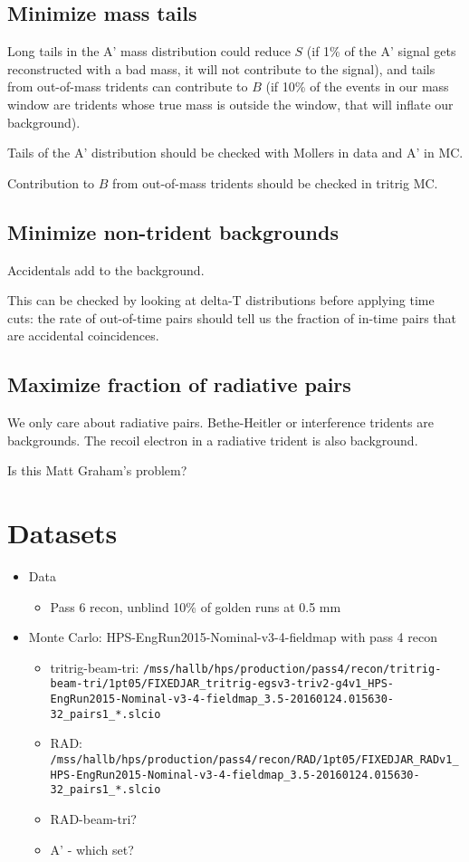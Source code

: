 \documentclass[twoside]{article}
\begin{document}
\subsection{Minimize mass tails}
Long tails in the A' mass distribution could reduce $S$ (if 1\% of the A' signal gets reconstructed with a bad mass, it will not contribute to the signal), and tails from out-of-mass tridents can contribute to $B$ (if 10\% of the events in our mass window are tridents whose true mass is outside the window, that will inflate our background).

Tails of the A' distribution should be checked with Mollers in data and A' in MC.

Contribution to $B$ from out-of-mass tridents should be checked in tritrig MC.

\subsection{Minimize non-trident backgrounds}
Accidentals add to the background.

This can be checked by looking at delta-T distributions before applying time cuts: the rate of out-of-time pairs should tell us the fraction of in-time pairs that are accidental coincidences.

\subsection{Maximize fraction of radiative pairs}
We only care about radiative pairs. Bethe-Heitler or interference tridents are backgrounds. The recoil electron in a radiative trident is also background.

Is this Matt Graham's problem?

\section{Datasets}
\begin{itemize}
    \item Data
        \begin{itemize}
            \item Pass 6 recon, unblind 10\% of golden runs at 0.5 mm
        \end{itemize}
    \item Monte Carlo: HPS-EngRun2015-Nominal-v3-4-fieldmap with pass 4 recon
        \begin{itemize}
            \item tritrig-beam-tri: \texttt{/mss/hallb/hps/production/pass4/recon/tritrig-beam-tri/1pt05/FIXEDJAR\_tritrig-egsv3-triv2-g4v1\_HPS-EngRun2015-Nominal-v3-4-fieldmap\_3.5-20160124.015630-32\_pairs1\_*.slcio}
            \item RAD: \texttt{/mss/hallb/hps/production/pass4/recon/RAD/1pt05/FIXEDJAR\_RADv1\_HPS-EngRun2015-Nominal-v3-4-fieldmap\_3.5-20160124.015630-32\_pairs1\_*.slcio}
            \item RAD-beam-tri?
            \item A' - which set?
        \end{itemize}
\end{itemize}
\end{document}
